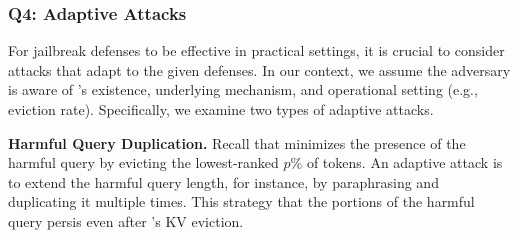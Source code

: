 










\subsubsection{Q4: Adaptive Attacks}
\label{sec:dilemma}

For jailbreak defenses to be effective in practical settings, it is crucial to consider attacks that adapt to the given defenses. In our context, we assume the adversary is aware of \rkv's existence, underlying mechanism, and operational setting (e.g., eviction rate). Specifically, we examine two types of adaptive attacks.

{\bf Harmful Query Duplication.} Recall that \rkv minimizes the presence of the harmful query by evicting the lowest-ranked $p\%$ of tokens. An adaptive attack is to extend the harmful query length, for instance, by paraphrasing and duplicating it multiple times. This strategy that the portions of the harmful query persis even after \rkv's KV eviction.  

